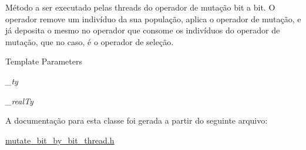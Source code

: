 Método a ser executado pelas threads do operador de mutação bit a bit. O operador remove um indivíduo da sua população, aplica o operador de mutação, e já deposita o mesmo no operador que consome os indivíduos do operador de mutação, que no caso, é o operador de seleção.


\begin{DoxyTemplParams}{Template Parameters}
\item[{\em \_\-ty}]\item[{\em \_\-realTy}]\end{DoxyTemplParams}


A documentação para esta classe foi gerada a partir do seguinte arquivo:\begin{DoxyCompactItemize}
\item 
\hyperlink{mutate__bit__by__bit__thread_8h}{mutate\_\-bit\_\-by\_\-bit\_\-thread.h}\end{DoxyCompactItemize}
